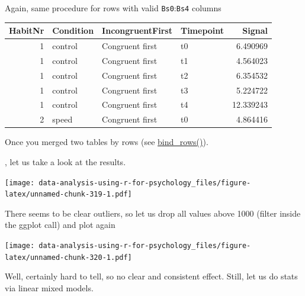 \documentclass[
]{book}
\begin{document}
Again, same procedure for rows with valid \texttt{Bs0}:\texttt{Bs4} columns

\begin{tabular}{r|l|l|l|r}
\hline
HabitNr & Condition & IncongruentFirst & Timepoint & Signal\\
\hline
1 & control & Congruent first & t0 & 6.490969\\
\hline
1 & control & Congruent first & t1 & 4.564023\\
\hline
1 & control & Congruent first & t2 & 6.354532\\
\hline
1 & control & Congruent first & t3 & 5.224722\\
\hline
1 & control & Congruent first & t4 & 12.339243\\
\hline
2 & speed & Congruent first & t0 & 4.864416\\
\hline
\end{tabular}

Once you merged two tables by rows (see \href{https://dplyr.tidyverse.org/reference/bind.html}{bind\_rows()}).

, let us take a look at the results.

\texttt{[image: data-analysis-using-r-for-psychology\_files/figure-latex/unnamed-chunk-319-1.pdf]}

There seems to be clear outliers, so let us drop all values above 1000 (filter inside the ggplot call) and plot again

\texttt{[image: data-analysis-using-r-for-psychology\_files/figure-latex/unnamed-chunk-320-1.pdf]}

Well, certainly hard to tell, so no clear and consistent effect. Still, let us do stats via linear mixed models.
\end{document}
